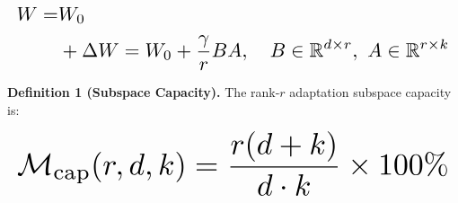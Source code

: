 \documentclass[10pt,journal,compsoc,twocolumn]{IEEEtran}
\begin{document}
\begin{equation}
\resizebox{\columnwidth}{!}{$\displaystyle
\begin{aligned}
W = & W_0 \\
& + \Delta W = W_0 + \frac{\gamma}{r}BA, \quad B \in \mathbb{R}^{d \times r},\ A \in \mathbb{R}^{r \times k}
\end{aligned}
$}
\end{equation}



























\textbf{Definition 1 (Subspace Capacity).} The rank-$r$ adaptation subspace capacity is:



























\begin{equation}
\resizebox{\columnwidth}{!}{$\displaystyle
\begin{aligned}
\mathcal{M}_{\text{cap}}(r, d, k) = \frac{r(d + k)}{d \cdot k} \times 100\%
\end{aligned}
$}
\end{equation}
\end{document}
